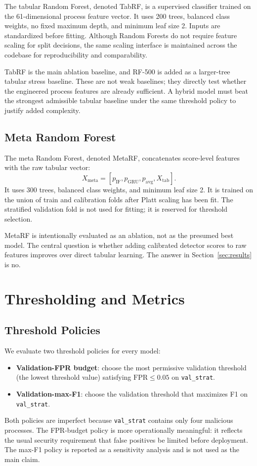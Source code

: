 \documentclass[10pt,journal,compsoc]{IEEEtran}
\begin{document}
The tabular Random Forest, denoted TabRF, is a supervised classifier trained on the 61-dimensional process feature vector. It uses 200 trees, balanced class weights, no fixed maximum depth, and minimum leaf size 2. Inputs are standardized before fitting. Although Random Forests do not require feature scaling for split decisions, the same scaling interface is maintained across the codebase for reproducibility and comparability.

TabRF is the main ablation baseline, and RF-500 is added as a larger-tree tabular stress baseline. These are not weak baselines; they directly test whether the engineered process features are already sufficient. A hybrid model must beat the strongest admissible tabular baseline under the same threshold policy to justify added complexity.

\subsection{Meta Random Forest}

The meta Random Forest, denoted MetaRF, concatenates score-level features with the raw tabular vector:
\[
X_{\text{meta}} = [p_{\text{IF}}, p_{\text{GRU}}, p_{\text{avg}}, X_{\text{tab}}].
\]
It uses 300 trees, balanced class weights, and minimum leaf size 2. It is trained on the union of train and calibration folds after Platt scaling has been fit. The stratified validation fold is not used for fitting; it is reserved for threshold selection.

MetaRF is intentionally evaluated as an ablation, not as the presumed best model. The central question is whether adding calibrated detector scores to raw features improves over direct tabular learning. The answer in Section~\ref{sec:results} is no.

\section{Thresholding and Metrics}
\label{sec:thresholds}

\subsection{Threshold Policies}

We evaluate two threshold policies for every model:
\begin{itemize}
    \item \textbf{Validation-FPR budget}: choose the most permissive validation threshold (the lowest threshold value) satisfying $\mathrm{FPR} \leq 0.05$ on \texttt{val\_strat}.
    \item \textbf{Validation-max-F1}: choose the validation threshold that maximizes F1 on \texttt{val\_strat}.
\end{itemize}
Both policies are imperfect because \texttt{val\_strat} contains only four malicious processes. The FPR-budget policy is more operationally meaningful: it reflects the usual security requirement that false positives be limited before deployment. The max-F1 policy is reported as a sensitivity analysis and is not used as the main claim.
\end{document}
